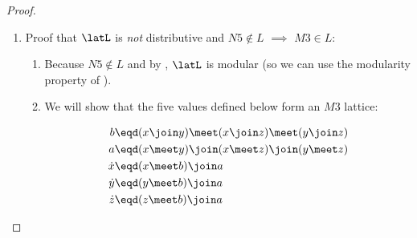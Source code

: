 \begin{proof}
\begin{enumerate}
\begin{enumerate}
      \item Proof that
            $\latL$ is \emph{not} distributive and $N5\notin L$ $\implies$ $M3\in L$:
        \begin{enumerate}
          \item Because $N5\notin L$ and by , $\latL$ is modular
                (so we can use the modularity property of ).

          \item We will show that the five values defined below form an $M3$
                lattice:\label{item:lat_distrib_iff_N5M3_def}
            \\\begin{minipage}{8\tw/16}
            \begin{align*}
              b       &\eqd (x \join y) \meet (x \join z) \meet (y \join z) \\
              a       &\eqd (x \meet y) \join (x \meet z) \join (y \meet z) \\
              \dot{x} &\eqd (x \meet b) \join a  \\
              \dot{y} &\eqd (y \meet b) \join a  \\
              \dot{z} &\eqd (z \meet b) \join a
            \end{align*}
            \end{minipage}%
            \begin{minipage}{2\tw/16}
            \end{minipage}


\end{enumerate}
\end{enumerate}
\end{enumerate}
\end{proof}
